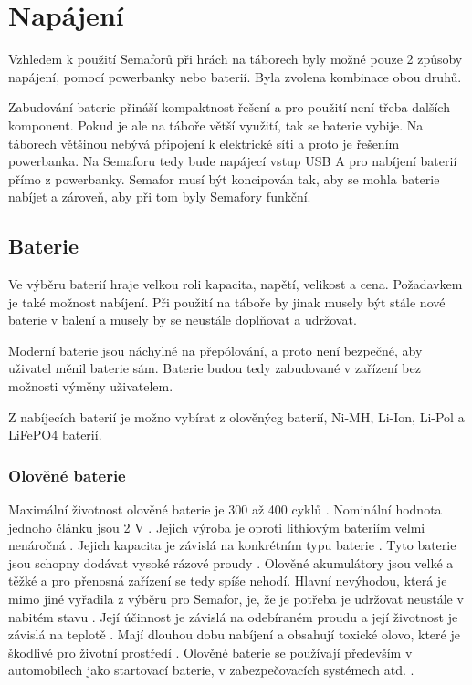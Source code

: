 \section{Napájení}
Vzhledem k použití Semaforů při hrách na táborech byly možné pouze 2 způsoby napájení, pomocí powerbanky nebo baterií. Byla zvolena kombinace obou druhů.

Zabudování baterie přináší kompaktnost řešení a pro použití není třeba dalších komponent. Pokud je ale na táboře větší využití, tak se baterie vybije.
Na táborech většinou nebývá připojení k elektrické síti a proto je řešením powerbanka. Na Semaforu tedy bude napájecí vstup USB A pro nabíjení baterií
přímo z powerbanky. Semafor musí být koncipován tak, aby se mohla baterie nabíjet a zároveň, aby při tom byly Semafory funkční.

\subsection{Baterie}
Ve výběru baterií hraje velkou roli kapacita, napětí, velikost a cena. Požadavkem je také možnost nabíjení. Při použití na táboře by jinak musely být stále 
nové baterie v balení a musely by se neustále doplňovat a udržovat.

Moderní baterie jsou náchylné na přepólování, a proto není bezpečné, aby uživatel měnil baterie sám. Baterie budou tedy zabudované v zařízení bez možnosti 
výměny uživatelem. 


Z nabíjecích baterií je možno vybírat z olověnýcg baterií, Ni-MH, Li-Ion, Li-Pol a LiFePO4 baterií.

\subsubsection{Olověné baterie}
Maximální životnost olověné baterie je 300 až 400 cyklů \cite{LiFePO4_malina}. Nominální hodnota jednoho článku jsou 2 V \cite{olovene}. Jejich výroba je oproti
lithiovým bateriím velmi nenáročná \cite{olovene}. Jejich kapacita je závislá na konkrétním typu baterie \cite{olovene}. Tyto baterie jsou schopny dodávat vysoké
rázové proudy \cite{akumulatory}. Olověné akumulátory jsou velké a těžké a pro přenosná zařízení se tedy spíše nehodí. Hlavní nevýhodou, která je mimo jiné vyřadila 
z výběru pro Semafor, je, že je potřeba je udržovat neustále v nabitém stavu \cite{olovene}. Její účinnost je závislá na odebíraném proudu a její životnost je závislá 
na teplotě \cite{olovene}. Mají dlouhou dobu nabíjení a obsahují toxické olovo, které je škodlivé pro životní prostředí \cite{olovene}. Olověné baterie se používají 
především v automobilech jako startovací baterie, v zabezpečovacích systémech atd. \cite{olovene}.

